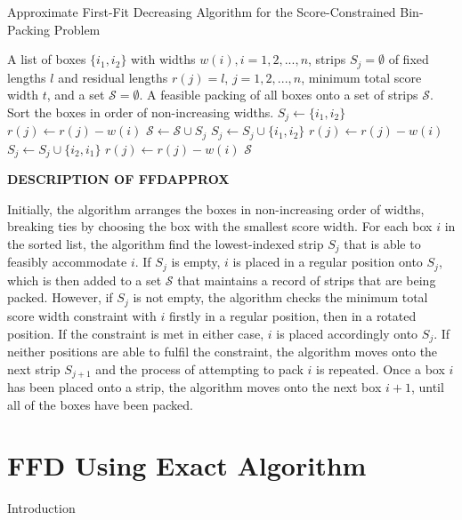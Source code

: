 \documentclass[oribibl]{llncs}
\begin{document}
\begin{algorithm}[H]
	\caption{\textcolor{OliveGreen}{Approximate First-Fit Decreasing Algorithm for the Score-Constrained Bin-Packing Problem}}
	\label{alg:ffdapprox}
	\begin{algorithmic}[1]
	\Require A list of boxes $\{i_1, i_2\}$ with widths $w(i), i = 1, 2, ..., n$, strips $S_j = \emptyset$ of fixed lengths $l$ and residual lengths $r(j) = l$, $j = 1, 2, ...,n$, minimum total score width $t$, and a set $\mathcal{S} = \emptyset$.
	\Ensure A feasible packing of all boxes onto a set of strips $\mathcal{S}$.
	\State Sort the boxes in order of non-increasing widths.
				\State $S_j \gets \{i_1, i_2\}$
				\State $r(j) \gets r(j) - w(i)$
				\State $\mathcal{S} \gets \mathcal{S} \cup S_j$
				\Break
					\State $S_j \gets S_j \cup \{i_1, i_2\}$
					\State $r(j) \gets r(j) - w(i)$
					\Break
					\State $S_j \gets S_j \cup \{i_2, i_1\}$
					\State $r(j) \gets r(j) - w(i)$
					\Break
				\EndIf
			\EndIf
		\EndFor
	\EndFor
	\Return $\mathcal{S}$
	\end{algorithmic}	
\end{algorithm}

\textbf{\textcolor{Rhodamine}{DESCRIPTION OF FFDAPPROX}}

Initially, the algorithm arranges the boxes in non-increasing order of widths, breaking ties by choosing the box with the smallest score width. For each box $i$ in the sorted list, the algorithm find the lowest-indexed strip $S_j$ that is able to feasibly accommodate $i$. If $S_j$ is empty, $i$ is placed in a regular position onto $S_j$, which is then added to a set $\mathcal{S}$ that maintains a record of strips that are being packed. However, if $S_j$ is not empty, the algorithm checks the minimum total score width constraint with $i$ firstly in a regular position, then in a rotated position. If the constraint is met in either case, $i$ is placed accordingly onto $S_j$. If neither positions are able to fulfil the constraint, the algorithm moves onto the next strip $S_{j+1}$ and the process of attempting to pack $i$ is repeated. Once a box $i$ has been placed onto a strip, the algorithm moves onto the next box $i+1$, until all of the boxes have been packed. 



\section{FFD Using Exact Algorithm}
\label{sec:ffdexact}
Introduction
\end{document}
